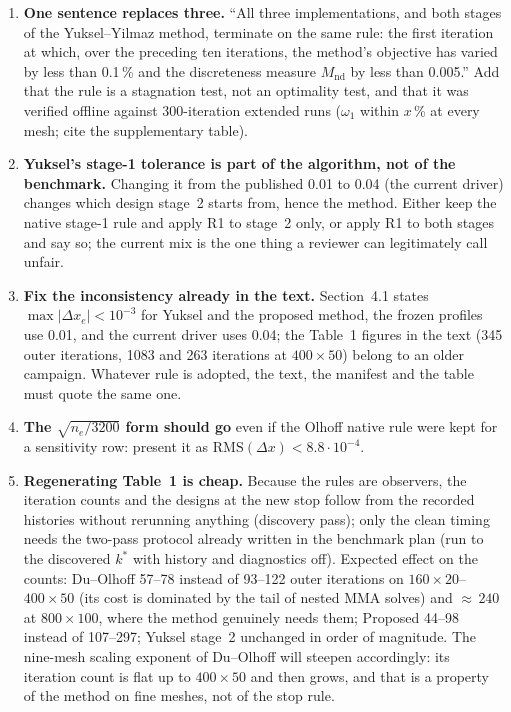 \documentclass[11pt,a4paper]{article}
\newcommand{\Mnd}{M_{\mathrm{nd}}}
\newcommand{\dx}{\Delta x}
\newcommand{\maxdx}{\max|\Delta x_e|}
\newcommand{\RMS}{\mathrm{RMS}}
\newcommand{\me}[2]{$#1\times#2$}
\begin{document}
\begin{enumerate}
\item \textbf{One sentence replaces three.} ``All three implementations, and
  both stages of the Yuksel--Yilmaz method, terminate on the same rule: the
  first iteration at which, over the preceding ten iterations, the method's
  objective has varied by less than 0.1\,\% and the discreteness measure $\Mnd$
  by less than 0.005.'' Add that the rule is a stagnation test, not an
  optimality test, and that it was verified offline against 300-iteration
  extended runs ($\omega_1$ within $x$\,\% at every mesh; cite the
  supplementary table).

\item \textbf{Yuksel's stage-1 tolerance is part of the algorithm, not of the
  benchmark.} Changing it from the published 0.01 to 0.04 (the current driver)
  changes which design stage~2 starts from, hence the method. Either keep the
  native stage-1 rule and apply R1 to stage~2 only, or apply R1 to both stages
  and say so; the current mix is the one thing a reviewer can legitimately call
  unfair.

\item \textbf{Fix the inconsistency already in the text.} Section~4.1 states
  $\maxdx < 10^{-3}$ for Yuksel and the proposed method, the frozen profiles use
  0.01, and the current driver uses 0.04; the Table~1 figures in the text (345
  outer iterations, 1083 and 263 iterations at \me{400}{50}) belong to an older
  campaign. Whatever rule is adopted, the text, the manifest and the table must
  quote the same one.

\item \textbf{The $\sqrt{n_e/3200}$ form should go} even if the Olhoff native
  rule were kept for a sensitivity row: present it as
  $\RMS(\dx) < 8.8\cdot10^{-4}$.

\item \textbf{Regenerating Table~1 is cheap.} Because the rules are observers,
  the iteration counts and the designs at the new stop follow from the recorded
  histories without rerunning anything (discovery pass); only the clean timing
  needs the two-pass protocol already written in the benchmark plan (run to the
  discovered $k^*$ with history and diagnostics off). Expected effect on the
  counts: Du--Olhoff 57--78 instead of 93--122 outer iterations on
  \me{160}{20}--\me{400}{50} (its cost is dominated by the tail of nested MMA
  solves) and ${\approx}\,240$ at \me{800}{100}, where the method genuinely
  needs them; Proposed 44--98 instead of 107--297; Yuksel stage~2 unchanged in
  order of magnitude. The nine-mesh scaling exponent of Du--Olhoff will steepen
  accordingly: its iteration count is flat up to \me{400}{50} and then grows,
  and that is a property of the method on fine meshes, not of the stop rule.


\end{enumerate}
\end{document}
